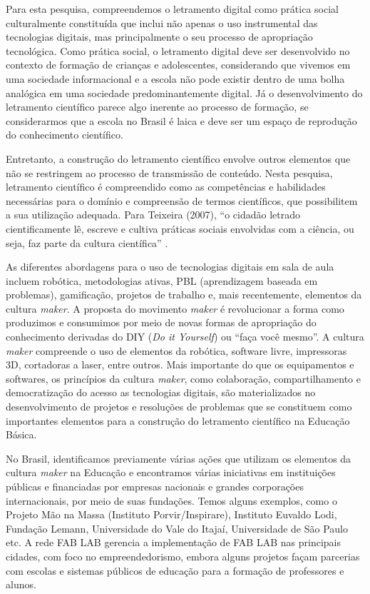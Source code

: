 \documentclass[portuguese]{textolivre}
\begin{document}
Para esta pesquisa, compreendemos o letramento digital como prática social culturalmente constituída que inclui não apenas o uso instrumental das tecnologias digitais, mas principalmente o seu processo de apropriação tecnológica. Como prática social, o letramento digital deve ser desenvolvido no contexto de formação de crianças e adolescentes, considerando que vivemos em uma sociedade informacional e a escola não pode existir dentro de uma bolha analógica em uma sociedade  predominantemente digital. Já o desenvolvimento do letramento científico parece algo inerente ao processo de formação, se considerarmos que a escola no Brasil é laica e deve ser um espaço de reprodução do conhecimento científico.

Entretanto, a construção do letramento científico envolve outros elementos que não se restringem ao processo de transmissão de conteúdo. Nesta pesquisa, letramento científico é compreendido como as competências e habilidades necessárias para o domínio e compreensão de termos científicos, que possibilitem a sua utilização adequada. Para Teixeira (2007), ``o cidadão letrado cientificamente lê, escreve e cultiva práticas sociais envolvidas com a ciência, ou seja, faz parte da cultura científica'' \cite[p.~27]{teixeira_categorizacao_2007}.

As diferentes abordagens para o uso de tecnologias digitais em sala de aula incluem robótica, metodologias ativas, PBL (aprendizagem baseada em problemas), gamificação, projetos de trabalho e, mais recentemente, elementos da cultura \textit{maker}. A proposta do movimento \textit{maker} é revolucionar a forma como produzimos e consumimos por meio de novas formas de apropriação do conhecimento derivadas do DIY (\textit{Do it Yourself}) ou ``faça você mesmo''. A cultura \textit{maker} compreende o uso de elementos da robótica, software livre, impressoras 3D, cortadoras a laser, entre outros. Mais importante do que os equipamentos e softwares, os princípios da cultura \textit{maker}, como colaboração, compartilhamento e democratização do acesso as tecnologias digitais, são materializados no desenvolvimento de projetos e resoluções de problemas que se constituem como importantes elementos para a construção do letramento científico na Educação Básica.

No Brasil, identificamos previamente várias ações que utilizam os elementos da cultura \textit{maker} na Educação e encontramos várias iniciativas em instituições públicas e financiadas por empresas nacionais e grandes corporações internacionais, por meio de suas fundações. Temos alguns exemplos, como o Projeto Mão na Massa (Instituto Porvir/Inspirare), Instituto Euvaldo Lodi, Fundação Lemann, Universidade do Vale do Itajaí, Universidade de São Paulo etc. A rede FAB LAB gerencia a implementação de FAB LAB nas principais cidades, com foco no empreendedorismo, embora alguns projetos façam parcerias com escolas e sistemas públicos de educação para a formação de professores e alunos.
\end{document}
